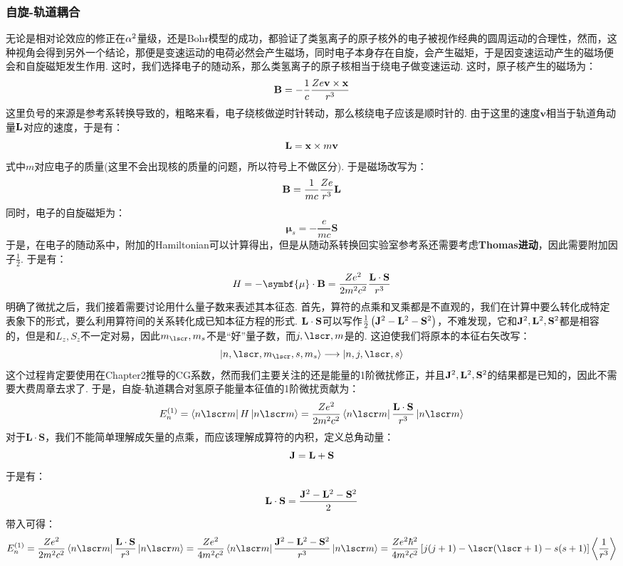 \subsubsection{自旋-轨道耦合}
无论是相对论效应的修正在\(\alpha^{2}\)量级，还是Bohr模型的成功，都验证了类氢离子的原子核外的电子被视作经典的圆周运动的合理性，然而，这种视角会得到另外一个结论，那便是变速运动的电荷必然会产生磁场，同时电子本身存在自旋，会产生磁矩，于是因变速运动产生的磁场便会和自旋磁矩发生作用. 这时，我们选择电子的随动系，那么类氢离子的原子核相当于绕电子做变速运动. 这时，原子核产生的磁场为：
\[
\mathbf{B} = -\frac{1}{c}\frac{Ze\mathbf{v}\times\mathbf{x}}{r^{3}}
\]
这里负号的来源是参考系转换导致的，粗略来看，电子绕核做逆时针转动，那么核绕电子应该是顺时针的. 由于这里的速度\(\mathbf{v}\)相当于轨道角动量\(\mathbf{L}\)对应的速度，于是有：
\[
\mathbf{L} = \mathbf{x}\times m\mathbf{v}
\]
式中\(m\)对应电子的质量(这里不会出现核的质量的问题，所以符号上不做区分). 于是磁场改写为：
\[
\mathbf{B} = \frac{1}{mc}\frac{Ze}{r^{3}}\mathbf{L}
\]
同时，电子的自旋磁矩为：
\[
\symbf{\mu}_{s} = -\frac{e}{mc}\mathbf{S}
\]
于是，在电子的随动系中，附加的Hamiltonian可以计算得出，但是从随动系转换回实验室参考系还需要考虑\textbf{Thomas进动}，因此需要附加因子\(\frac{1}{2}\). 于是有：
\[
H = -\symbf{\mu}\cdot\vB = \frac{Ze^{2}}{2m^{2}c^{2}}\frac{\vL\cdot\vS}{r^{3}}
\]
明确了微扰之后，我们接着需要讨论用什么量子数来表述其本征态. 首先，算符的点乘和叉乘都是不直观的，我们在计算中要么转化成特定表象下的形式，要么利用算符间的关系转化成已知本征方程的形式. \(\mathbf{L}\cdot\mathbf{S}\)可以写作\(\frac{1}{2}\left({\mathbf{J}^{2} - \mathbf{L}^{2} - \mathbf{S}^{2}}\right)\)，不难发现，它和\(\mathbf{J}^{2},\mathbf{L}^{2},\mathbf{S}^{2}\)都是相容的，但是和\(L_{z},S_{z}\)不一定对易，因此\(m_{\lscr},m_{s}\)不是“好”量子数，而\(j,\lscr,m\)是的. 这迫使我们将原本的本征右矢改写：
\[
\ket{n,\lscr,m_{\lscr},s,m_{s}} \longrightarrow \ket{n,j,\lscr,s}
\]
这个过程肯定要使用在Chapter2推导的CG系数，然而我们主要关注的还是能量的1阶微扰修正，并且\(\mathbf{J}^{2},\mathbf{L}^{2},\mathbf{S}^{2}\)的结果都是已知的，因此不需要大费周章去求了. 于是，自旋-轨道耦合对氢原子能量本征值的1阶微扰贡献为：
\[
E_{n}^{(1)} = \bra{n\lscr m}H\ket{n\lscr m} = \frac{Ze^{2}}{2m^{2}c^{2}}\bra{n\lscr m}\frac{\vL\cdot\vS}{r^{3}}\ket{n\lscr m} 
\]
对于\(\mathbf{L}\cdot\mathbf{S}\)，我们不能简单理解成矢量的点乘，而应该理解成算符的内积，定义总角动量：
\[
\mathbf{J} = \mathbf{L} + \mathbf{S}
\]
于是有：
\[
\mathbf{L}\cdot\mathbf{S} = \frac{\mathbf{J}^{2} - \mathbf{L}^{2} - \mathbf{S}^{2}}{2}
\]
带入可得：
\[
E_{n}^{(1)}= \frac{Ze^{2}}{2m^{2}c^{2}}\bra{n\lscr m}\frac{\vL\cdot\vS}{r^{3}}\ket{n\lscr m} = \frac{Ze^{2}}{4m^{2}c^{2}}\bra{n\lscr m}\frac{\vJ^{2} - \vL^{2} - \vS^{2}}{r^{3}}\ket{n\lscr m} = \frac{Ze^{2}\hh^{2}}{4m^{2}c^{2}}\mbr{j(j+1)-\lscr(\lscr+1)-s(s+1)}\avg{\frac{1}{r^{3}}}
\]
